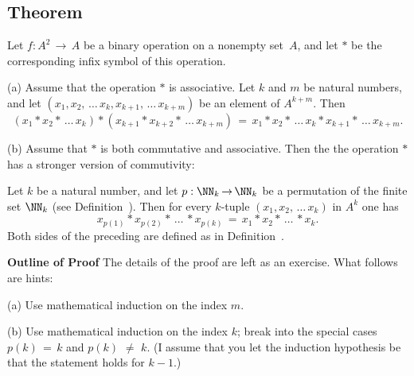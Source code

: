 {\VV

            \subsection{\small{\bf Theorem}}
            \label{ThmA60.50}

        Let $f:A^{2} \,{\rightarrow}\, A$ be a binary operation on a nonempty set~$A$, and let ${\ast}$ be the corresponding infix symbol of this operation.

\V

        (a) Assume that the operation ${\ast}$ is associative. Let $k$ and $m$ be natural numbers,
    and let $(x_{1}, x_{2},\,{\ldots}\,x_{k}, x_{k+1},\,{\ldots}\,x_{k+m})$ be an element of $A^{k+m}$. Then
        \begin{displaymath}
        \left(x_{1}{\ast}x_{2}{\ast}\,{\ldots}\,x_{k}\right)
    {\ast}
        \left(x_{k+1}{\ast}x_{k+2}{\ast}\,{\ldots}\,x_{k+m}\right)
     \,=\, 
  x_{1}{\ast}x_{2}{\ast}\,{\ldots}\,x_{k}{\ast}x_{k+1}{\ast}\,{\ldots}\,x_{k+m}.
        \end{displaymath}
    
\V

        (b) Assume that ${\ast}$ is both commutative and associative. Then the the operation ${\ast}$ has a stronger version of commutivity:

        Let $k$ be a natural number, and let $p:{\NN}_{k} \,{\rightarrow}\, {\NN}_{k}$ be a permutation of the finite set ${\NN}_{k}$
    (see Definition~).
    Then for every $k$-tuple $(x_{1}, x_{2},\,{\ldots}\,x_{k})$ in $A^{k}$ one has
        \begin{displaymath}
        x_{p(1)}{\ast}x_{p(2)}{\ast}\,{\ldots}\,{\ast}x_{p(k)} \,=\, 
        x_{1}{\ast}x_{2}{\ast}\,{\ldots}\,{\ast}x_{k}.
        \end{displaymath}
    Both sides of the preceding are defined as in Definition~.

\V

        {\bf Outline of Proof} The details of the proof are left as an exercise. What follows are hints:

        (a) Use mathematical induction on the index $m$.

\V

        (b) Use mathematical induction on the index $k$; break into the special cases $p(k) \,=\, k$ and $p(k) \,\,{\neq}\,\, k$.
    (I assume that you let the induction hypothesis be that the statement holds for $k-1$.)

}
